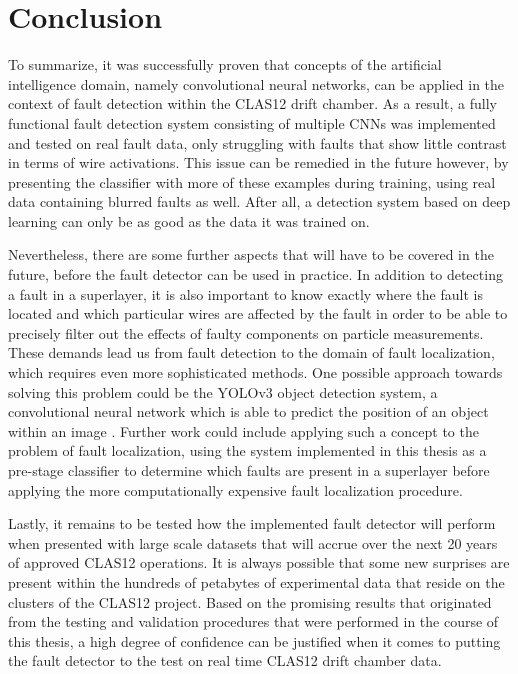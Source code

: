 \chapter{Conclusion}

To summarize, it was successfully proven that concepts of the
artificial intelligence domain, namely convolutional neural networks,
can be applied in the context of fault detection within the CLAS12
drift chamber. As a result, a fully functional fault detection system
consisting of multiple CNNs was implemented and tested on real fault
data, only struggling with faults that show little contrast in terms
of wire activations. This issue can be remedied in the future however,
by presenting the classifier with more of these examples
during training, using real data containing blurred faults as
well. After all, a detection system based on deep learning
can only be as good as the data it was trained on.

Nevertheless, there are some further aspects that will have to be
covered in the future, before the fault detector can be used in
practice. In addition to detecting a fault in a superlayer, it is also
important to know exactly where the fault is located and which
particular wires are affected by the fault in order to be able to
precisely filter out the effects of faulty components on particle
measurements. These demands lead us from fault detection to the
domain of fault localization, which requires even more sophisticated
methods. One possible approach towards solving this problem could be
the YOLOv3 object detection system, a convolutional neural network
which is able to predict the position of an object within an image
\cite{yolo}. Further work could include applying such a concept to the
problem of fault localization, using the system implemented in
this thesis as a pre-stage classifier to determine which faults are
present in a superlayer before applying the more computationally
expensive fault localization procedure.

Lastly, it remains to be tested how the implemented fault detector
will perform when presented with large scale datasets that will accrue over
the next 20 years of approved CLAS12 operations. It is always possible
that some new surprises are present within the hundreds of petabytes
of experimental data that reside on the clusters of the CLAS12
project. Based on the promising results that originated from the testing
and validation procedures that were performed in the course of this
thesis, a high degree of confidence can be justified when it comes to
putting the fault detector to the test on real time CLAS12 drift
chamber data.
